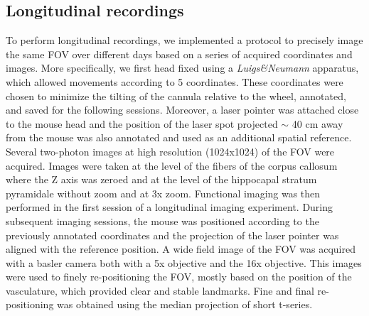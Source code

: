 \subsection{Longitudinal recordings}
\label{chap3:sec:1:subsec4:long_recordings}
To perform longitudinal recordings, we implemented a protocol to precisely image the same FOV over different days based on a series of acquired coordinates and images. 
More specifically, we first head fixed using a \textit{Luigs\&Neumann} apparatus, which allowed movements according to 5 coordinates.
These coordinates were chosen to minimize the tilting of the cannula relative to the wheel, annotated, and saved for the following sessions.
Moreover, a laser pointer was attached close to the mouse head and the position of the laser spot projected $\sim$ 40 cm away from the mouse was also annotated and used as an additional spatial reference.
Several two-photon images at high resolution (1024x1024) of the FOV were acquired.
Images were taken at the level of the fibers of the corpus callosum where the Z axis was zeroed and at the level of the hippocapal stratum pyramidale without zoom and at 3x zoom.
Functional imaging was then performed in the first session of a longitudinal imaging experiment.
During subsequent imaging sessions, the mouse was positioned according to the previously annotated coordinates and the projection of the laser pointer was aligned with the reference position. A wide field image of the FOV was acquired with a basler camera both with a 5x objective and the 16x objective. 
This images were used to finely re-positioning the FOV, mostly based on the position of the vasculature, which provided clear and stable landmarks.
Fine and final re-positioning was obtained using the median projection of short t-series.

